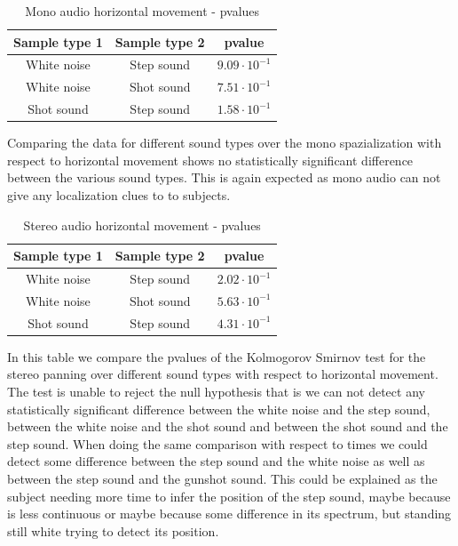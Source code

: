 \documentclass[conference]{IEEEtran}
\begin{document}
\begin{table}[htbp]
\caption{Mono audio horizontal movement - pvalues}
\begin{center}
\begin{tabular}{|c|c|c|}
\hline
\textbf{Sample type 1} & \textbf{Sample type 2} & \textbf{pvalue}\\
\hline
White noise & Step sound & $9.09 \cdot 10^{-1}$\\
\hline
White noise & Shot sound & $7.51 \cdot 10^{-1}$\\
\hline
Shot sound & Step sound & $1.58 \cdot 10^{-1}$\\
\hline
\end{tabular}
\label{tab41}
\end{center}
\end{table}

Comparing the data for different sound types over the mono spazialization with respect to horizontal movement shows no statistically significant difference between the various sound types. This is again expected as mono audio can not give any localization clues to to subjects.

\begin{table}[htbp]
\caption{Stereo audio horizontal movement - pvalues}
\begin{center}
\begin{tabular}{|c|c|c|}
\hline
\textbf{Sample type 1} & \textbf{Sample type 2} & \textbf{pvalue}\\
\hline
White noise & Step sound & $2.02 \cdot 10^{-1}$\\
\hline
White noise & Shot sound & $5.63 \cdot 10^{-1}$\\
\hline
Shot sound & Step sound & $4.31 \cdot 10^{-1}$\\
\hline
\end{tabular}
\label{tab61}
\end{center}
\end{table}

In this table we compare the pvalues of the Kolmogorov Smirnov test for the stereo panning over different sound types with respect to horizontal movement. The test is unable to reject the null hypothesis that is we can not detect any statistically significant difference between the white noise and the step sound, between the white noise and the shot sound and between the shot sound and the step sound. When doing the same comparison with respect to times we could detect some difference between the step sound and the white noise as well as between the step sound and the gunshot sound. This could be explained as the subject needing more time to infer the position of the step sound, maybe because is less continuous or maybe because some difference in its spectrum, but standing still white trying to detect its position.
\end{document}
